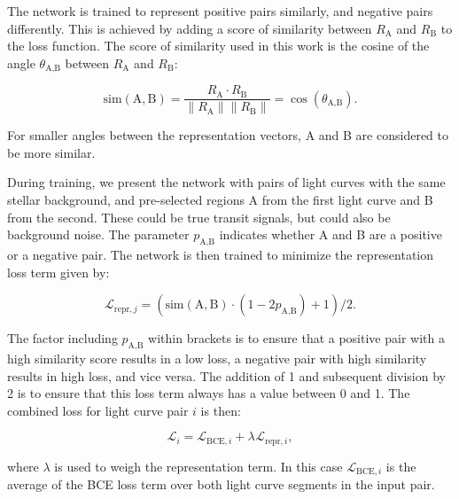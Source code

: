 The network is trained to represent positive pairs similarly, and negative pairs differently. This is achieved by adding a score of similarity between $R_\text{A}$ and $R_\text{B}$ to the loss function. The score of similarity used in this work is the cosine of the angle $\theta_{\text{A}, \text{B}}$ between $R_\text{A}$ and $R_\text{B}$:

\begin{equation}
    \text{sim}(\text{A}, \text{B})  = \frac{R_\text{A} \cdot R_\text{B}}{\|R_\text{A}\|\|R_\text{B}\|} = \cos(\theta_{\text{A}, \text{B}}).
\end{equation}

\noindent For smaller angles between the representation vectors, A and B are considered to be more similar. 

During training, we present the network with pairs of light curves with the same stellar background, and pre-selected regions A from the first light curve and B from the second. These could be true transit signals, but could also be background noise. The parameter $p_{\text{A},\text{B}}$ indicates whether A and B are a positive or a negative pair. The network is then trained to minimize the representation loss term given by:

\begin{equation}
   \mathcal{L}_{\text{repr}, j} =(\text{sim}(\text{A}, \text{B}) \cdot(1 - 2  p_{\text{A},\text{B}}) + 1) / 2.
\end{equation}

\noindent The factor including $p_{\text{A},\text{B}}$ within brackets is to ensure that a positive pair with a high similarity score results in a low loss, a negative pair with high similarity results in high loss, and vice versa. The addition of 1 and subsequent division by 2 is to ensure that this loss term always has a value between 0 and 1. The combined loss for light curve pair $i$ is then:

\begin{equation}
    \mathcal{L}_{i} = \mathcal{L}_{\text{BCE}, i} + \lambda_{} \mathcal{L}_{\text{repr}, i},
\end{equation}

\noindent where $\lambda$ is used to weigh the representation term. In this case $\mathcal{L}_{\text{BCE}, i}$ is the average of the BCE loss term over both light curve segments in the input pair.

